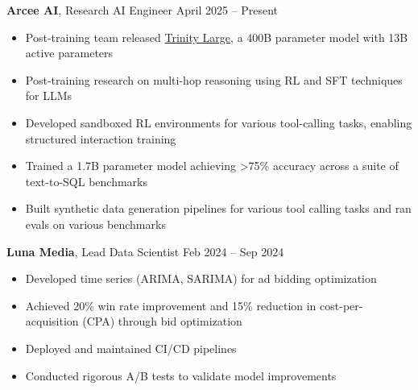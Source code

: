 \documentclass[a4paper,10pt]{article}
\begin{document}
\textbf{Arcee AI}, Research AI Engineer \hfill April 2025 -- Present
\begin{itemize}
    \item Post-training team released \href{https://github.com/arcee-ai/trinity-large-tech-report/blob/main/Arcee\%20Trinity\%20Large.pdf}{Trinity Large}, a 400B parameter model with 13B active parameters
    \item Post-training research on multi-hop reasoning using RL and SFT techniques for LLMs
    \item Developed sandboxed RL environments for various tool-calling tasks, enabling structured interaction training
    \item Trained a 1.7B parameter model achieving >75\% accuracy across a suite of text-to-SQL benchmarks
    \item Built synthetic data generation pipelines for various tool calling tasks and ran evals on various benchmarks
\end{itemize}

\textbf{Luna Media}, Lead Data Scientist \hfill Feb 2024 -- Sep 2024
\begin{itemize}
    \item Developed time series (ARIMA, SARIMA) for ad bidding optimization
    \item Achieved 20\% win rate improvement and 15\% reduction in cost-per-acquisition (CPA) through bid optimization
    \item Deployed and maintained CI/CD pipelines
    \item Conducted rigorous A/B tests to validate model improvements
\end{itemize}
\end{document}
